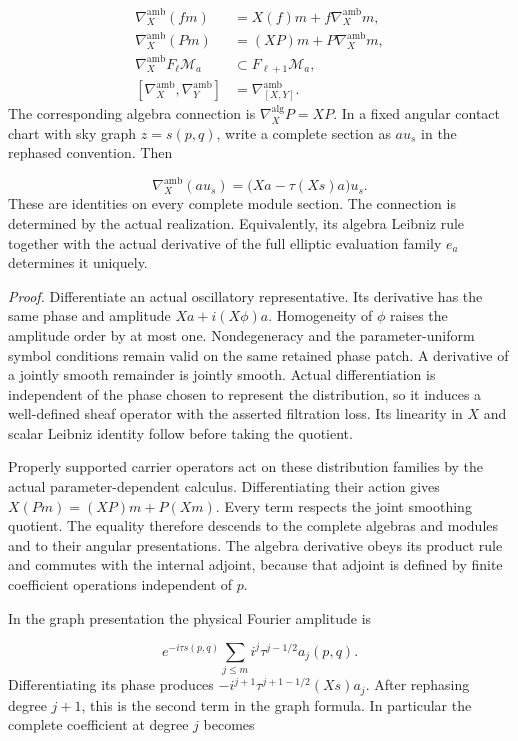 \documentclass[
  english,
  11pt,
  reqno]{amsart}
\begin{document}
\label{eq:online-ambient-point-connection-laws} \[
\begin{aligned}
\nabla_X^{\mathrm{amb}}(fm)
 &=X(f)m+f\nabla_X^{\mathrm{amb}}m,\\
\nabla_X^{\mathrm{amb}}(Pm)
 &=(XP)m+P\nabla_X^{\mathrm{amb}}m,\\
\nabla_X^{\mathrm{amb}}F_\ell\mathscr M_a
 &\subset F_{\ell+1}\mathscr M_a,\\
[\nabla_X^{\mathrm{amb}},\nabla_Y^{\mathrm{amb}}]
 &=\nabla_{[X,Y]}^{\mathrm{amb}}.
\end{aligned}
\] The corresponding algebra connection is
\(\nabla_X^{\mathrm{alg}}P=XP\). In a fixed angular contact chart with
sky graph \(z=s(p,q)\), write a complete section as \(a u_s\) in the
rephased convention. Then

\label{eq:online-ambient-point-graph-formula} \[
\nabla_X^{\mathrm{amb}}(a u_s)
=\bigl(Xa-\tau(Xs)a\bigr)u_s.
\] These are identities on every complete module section. The connection
is determined by the actual realization. Equivalently, its algebra
Leibniz rule together with the actual derivative of the full elliptic
evaluation family \(e_a\) determines it uniquely.

\emph{Proof.} Differentiate an actual oscillatory representative. Its
derivative has the same phase and amplitude \(Xa+i(X\phi)a\).
Homogeneity of \(\phi\) raises the amplitude order by at most one.
Nondegeneracy and the parameter-uniform symbol conditions remain valid
on the same retained phase patch. A derivative of a jointly smooth
remainder is jointly smooth. Actual differentiation is independent of
the phase chosen to represent the distribution, so it induces a
well-defined sheaf operator with the asserted filtration loss. Its
linearity in \(X\) and scalar Leibniz identity follow before taking the
quotient.

Properly supported carrier operators act on these distribution families
by the actual parameter-dependent calculus. Differentiating their action
gives \(X(Pm)=(XP)m+P(Xm)\). Every term respects the joint smoothing
quotient. The equality therefore descends to the complete algebras and
modules and to their angular presentations. The algebra derivative obeys
its product rule and commutes with the internal adjoint, because that
adjoint is defined by finite coefficient operations independent of
\(p\).

In the graph presentation the physical Fourier amplitude is

\label{eq:online-ambient-physical-graph-amplitude} \[
e^{-i\tau s(p,q)}
\sum_{j\le m}i^j\tau^{j-1/2}a_j(p,q).
\] Differentiating its phase produces \(-i^{j+1}\tau^{j+1-1/2}(Xs)a_j\).
After rephasing degree \(j+1\), this is the second term in the graph
formula. In particular the complete coefficient at degree \(j\) becomes
\end{document}
